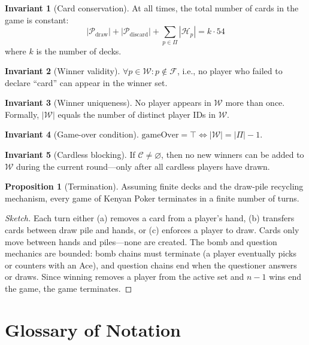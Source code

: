 \documentclass[11pt,a4paper,twoside]{article}
\theoremstyle{definition}
\newtheorem{proposition}{Proposition}[section]
\newtheorem{invariant}{Invariant}[section]
\theoremstyle{remark}
\newcommand{\Hand}{\ensuremath{\mathcal{H}}}
\newcommand{\Pile}{\ensuremath{\mathcal{P}}}
\newcommand{\Players}{\ensuremath{\Pi}}
\newcommand{\Winner}{\ensuremath{\mathcal{W}}}
\newcommand{\Cardless}{\ensuremath{\mathcal{C}}}
\newcommand{\Failed}{\ensuremath{\mathcal{F}}}
\begin{document}
\begin{invariant}[Card conservation]
  At all times, the total number of cards in the game is constant:
  \[
  |\Pile_{\text{draw}}| + |\Pile_{\text{discard}}| + \sum_{p \in \Players} |\Hand_p| = k \cdot 54
  \]
  where $k$ is the number of decks.
\end{invariant}

\begin{invariant}[Winner validity]
  $\forall p \in \Winner : p \notin \Failed$, i.e., no player who failed to
  declare ``card'' can appear in the winner set.
\end{invariant}

\begin{invariant}[Winner uniqueness]
  No player appears in $\Winner$ more than once. Formally,
  $|\Winner|$ equals the number of distinct player IDs in $\Winner$.
\end{invariant}

\begin{invariant}[Game-over condition]
  $\text{gameOver} = \top \iff |\Winner| = |\Players| - 1$.
\end{invariant}

\begin{invariant}[Cardless blocking]
  If $\Cardless \neq \varnothing$, then no new winners can be added to
  $\Winner$ during the current round---only after all cardless players have
  drawn.
\end{invariant}

\begin{proposition}[Termination]
  Assuming finite decks and the draw-pile recycling mechanism, every game of
  Kenyan Poker terminates in a finite number of turns.
\end{proposition}

\begin{proof}[Sketch]
  Each turn either (a) removes a card from a player's hand, (b) transfers
  cards between draw pile and hands, or (c) enforces a player to draw. Cards
  only move between hands and piles---none are created. The bomb and question
  mechanics are bounded: bomb chains must terminate (a player eventually picks
  or counters with an Ace), and question chains end when the questioner
  answers or draws. Since winning removes a player from the active set and
  $n-1$ wins end the game, the game terminates.
\end{proof}

\section{Glossary of Notation}
\label{sec:notation}
\end{document}
